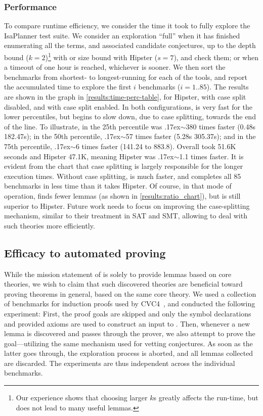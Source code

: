 \subsubsection{Performance}

To compare runtime efficiency, we consider the time it took to fully explore the IsaPlanner test suite.
We consider an exploration ``full'' when it has finished enumerating all the terms, and associated candidate conjectures, up to the depth bound ($k=2$)\footnote{Our experience shows that choosing larger $k$s greatly affects the run-time, but does not lead to many useful lemmas.} with \TheSy or size bound with Hipster ($s=7$), and check them; or when a timeout of one hour is reached, whichever is sooner.
We then sort the benchmarks from shortest- to longest-running for each of the tools, and report the accumulated time to explore the first $i$ benchmarks ($i=1..85$).
The results are shown in the graph in \autoref{results:time-perc-table}, for Hipster, \TheSy with case split disabled, and \TheSy with case split enabled.
In both configurations, \TheSy is very fast for the lower percentiles, but begins to slow down, due to case splitting, towards the end of the line.
To illustrate, in the 25th percentile \TheSy was {\raise.17ex\hbox{$\scriptstyle\sim$}}380 times faster (0.48s \vs 182.47s); in the 50th percentile, {\raise.17ex\hbox{$\scriptstyle\sim$}}57 times faster (5.28s \vs 305.37s); and in the 75th percentile, {\raise.17ex\hbox{$\scriptstyle\sim$}}6 times faster (141.24 to 883.8).
Overall \TheSy took 51.6K seconds and Hipster 47.1K, meaning Hipster was {\raise.17ex\hbox{$\scriptstyle\sim$}}1.1 times faster.
It is evident from the chart that case splitting is largely responsible for the longer execution times. Without case splitting, \TheSy is much faster, and completes all 85 benchmarks in less time than it takes Hipster.
Of course, in that mode of operation, \TheSy finds fewer lemmas (as shown in \autoref{results:ratio_chart}), but is still superior to Hipster.
Future work needs to focus on improving the case-splitting mechanism, similar to their treatment in SAT and SMT, allowing \TheSy to deal with such theories more efficiently.

\subsection{Efficacy to automated proving}

While the mission statement of \TheSy is solely to provide lemmas based on core theories,
we wish to claim that such discovered theories are beneficial toward proving theorems in general, based on the same core theory.
We used a collection of benchmarks for induction proofs used by CVC4~\cite{cvc4induction}, and conducted the following experiment: First, the proof goals are skipped and only the symbol declarations and provided axioms are used to construct an input to \TheSy.
Then, whenever a new lemma is discovered and passes through the prover, we also attempt to prove the goal---utilizing the same mechanism used for vetting conjectures.
As soon as the latter goes through, the exploration process is aborted, and all lemmas collected are discarded.
The experiments are thus independent across the individual benchmarks.

